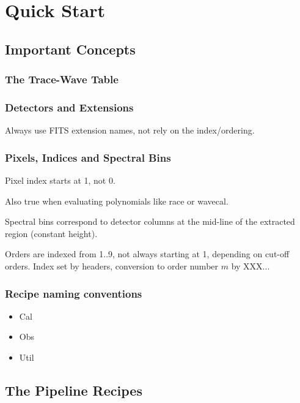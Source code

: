 \section{Quick Start}
\label{sec:cookbook}


\subsection{Important Concepts}
\subsubsection{The Trace-Wave Table}

\subsubsection{Detectors and Extensions}
Always use FITS extension names, not rely on the index/ordering.


\subsubsection{Pixels, Indices and Spectral Bins}
Pixel index starts at 1, not 0.

Also true when evaluating polynomials like race or wavecal.

Spectral bins correspond to detector columns at the mid-line of the extracted region (constant height).

Orders are indexed from 1..9, not always starting at 1, depending on cut-off orders. Index set by headers, conversion
to order number $m$ by XXX...

\subsubsection{Recipe naming conventions}
\begin{itemize}
    \item Cal
    \item Obs
    \item Util
\end{itemize}

\subsection{The Pipeline Recipes}
\label{sec:recipes-quick}


